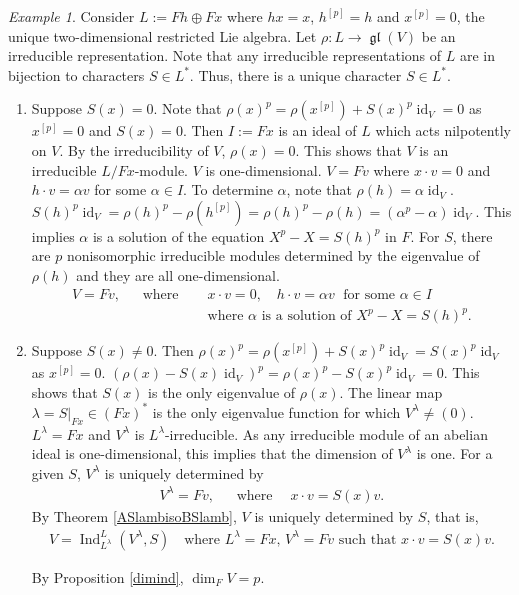\documentclass[12pt,MSc]{muthesis_2023}
\theoremstyle{plain}%
\theoremstyle{definition}
\theoremstyle{remark}
\newtheorem{Example}[FactCounter]{Example} %
\DeclareMathOperator{\gl}{\mathfrak{gl}}
\DeclareMathOperator{\id}{id}
\DeclareMathOperator{\Ind}{Ind}
\begin{document}
\begin{Example}\label{hxisoclasses}
Consider $L:= Fh\oplus Fx$ where $hx=x$, $h^{[p]}=h$ and $x^{[p]}=0$, the unique two-dimensional restricted Lie algebra. Let $\rho:L \rightarrow \gl(V)$ be an irreducible representation. Note that any irreducible representations of $L$ are in bijection to characters $S\in L^*$. Thus, there is a unique character $S\in L^*$.

\begin{enumerate}
\item[(a)] Suppose $S(x)=0$. Note that ${\rho(x)}^p=\rho(x^{[p]})+{S(x)}^p\id_V=0$ as $x^{[p]}=0$ and $S(x)=0$. Then $I:= Fx$ is an ideal of $L$ which acts nilpotently on $V$. By the irreducibility of $V$, $\rho(x)=0$. This shows that $V$ is an irreducible $L/Fx$-module. $V$ is one-dimensional. $V=Fv$ where $x \cdot v=0$ and $h\cdot v=\alpha v$ for some $\alpha\in I$. To determine $\alpha$, note that $\rho(h)=\alpha\id_V$. ${S(h)}^p\id_V={\rho(h)}^p-\rho(h^{[p]})={\rho(h)}^p-\rho(h)=(\alpha^p-\alpha)\id_V$. This implies $\alpha$ is a solution of the equation $X^p-X={S(h)}^p$ in $F$. For $S$, there are $p$ nonisomorphic irreducible modules determined by the eigenvalue of $\rho(h)$ and they are all one-dimensional.
\begin{align*}
V=Fv,\;\;\quad\text{where} \; \quad& x \cdot v=0,\quad h\cdot v=\alpha v \;\text{  for some }\alpha\in I\\
&\text{where $\alpha$ is a solution of $X^p-X={S(h)}^p$.}
\end{align*}


\item[(b)]
Suppose $S(x)\neq 0$. Then ${\rho(x)}^p=\rho(x^{[p]})+{S(x)}^p\id_V={S(x)}^p\id_V$ as $x^{[p]}=0$. ${(\rho(x)-S(x)\id_V)}^p={\rho(x)}^p-{S(x)}^p\id_V=0$. This shows that $S(x)$ is the only eigenvalue of $\rho(x)$. The linear map $\lambda=S|_{Fx}\in {(Fx)}^*$ is the only eigenvalue function for which $V^{\lambda}\neq(0)$. $L^{\lambda}=Fx$ and $V^{\lambda}$ is $L^{\lambda}$-irreducible. As any irreducible module of an abelian ideal is one-dimensional, this implies that the dimension of $V^{\lambda}$ is one. For a given $S$, $V^{\lambda}$ is uniquely determined by
\begin{align*}
V^{\lambda}=Fv, \;\;\quad\text{where} \;\quad x \cdot v=S(x)v.
\end{align*}
By Theorem \ref{ASlambisoBSlamb}, $V$ is uniquely determined by $S$, that is,
\begin{align*}
V=\Ind^L_{L^{\lambda}}(V^{\lambda}, S) \quad\text{where $L^{\lambda}= Fx$, $V^{\lambda}=Fv$ such that $x \cdot v=S(x)v$}.
\end{align*}

By Proposition \ref{dimind}, $\dim_FV=p$.
\end{enumerate}
\end{Example}
\end{document}
